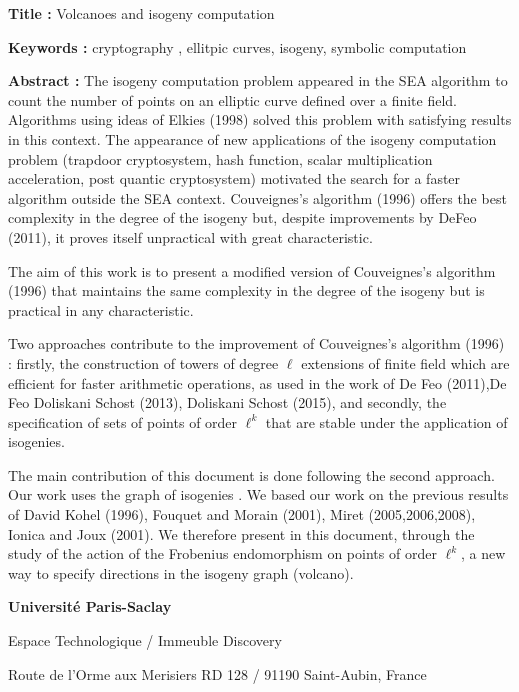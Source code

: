 \documentclass[a4paper, titlepage, 11pt]{book}
\newcommand{\titreeng}{Volcanoes and isogeny computation}
\begin{document}
\begin{breakbox}

\noindent\textbf{Title : }\titreeng

\vspace{2ex}

\noindent\textbf{Keywords : }cryptography , ellitpic curves, isogeny, 
symbolic computation

\begin{multicols}{2}
\noindent\textbf{Abstract : }
The isogeny computation problem appeared in the SEA algorithm to count the number 
of points on an elliptic curve defined over a finite field. Algorithms using 
ideas of Elkies (1998) solved this problem with satisfying results in this 
context. The appearance of new applications of the isogeny computation problem 
(trapdoor cryptosystem, hash function, scalar multiplication acceleration, post
quantic cryptosystem) motivated the search for a faster algorithm outside the 
SEA context. Couveignes's algorithm (1996) offers the best complexity in the 
degree of the isogeny but, despite improvements by DeFeo (2011), it proves 
itself unpractical with great characteristic.

The aim of this work is to present a modified version of Couveignes's 
algorithm (1996) that maintains the same complexity in the degree of the 
isogeny but is practical in any characteristic.

Two approaches contribute to the improvement of Couveignes's algorithm
(1996) : firstly, the construction of towers of degree $\ell$ extensions of finite field 
which are efficient for faster arithmetic operations, as used in the work of De Feo 
(2011),De Feo Doliskani Schost (2013), Doliskani Schost (2015), and secondly, 
the specification of sets of points of order $\ell^k$ that are stable under the application
of isogenies.

The main contribution of this document is done following the second approach. 
Our work uses the graph of isogenies . We based our work on the previous 
results of David Kohel (1996), Fouquet and Morain (2001), Miret 
(2005,2006,2008), Ionica and Joux (2001). We therefore present in this 
document, through the study of the action of the Frobenius endomorphism on 
points of order $\ell^k$, a new way to specify directions in the isogeny graph (volcano). 

\end{multicols}
\end{breakbox}


{\tiny
\noindent
\textbf{Université Paris-Saclay}

\noindent
Espace Technologique / Immeuble Discovery

\noindent
Route de l’Orme aux Merisiers RD 128 / 91190 Saint-Aubin, France 

}
\end{document}
